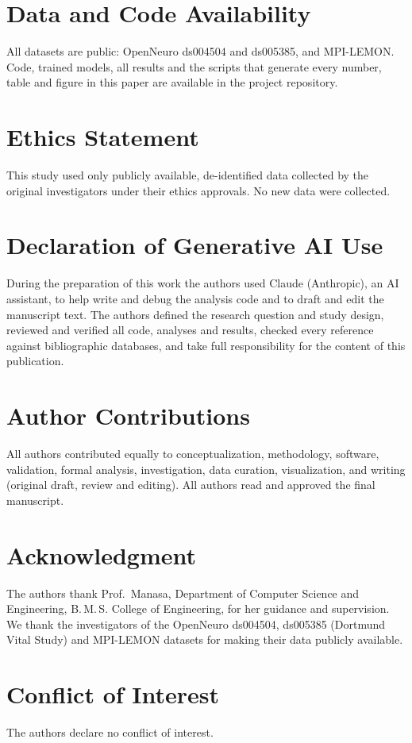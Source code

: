 \documentclass[journal]{IEEEtran}
\begin{document}
\section*{Data and Code Availability}
All datasets are public: OpenNeuro ds004504 and ds005385, and MPI-LEMON. Code, trained models, all results and the scripts that generate every number, table and figure in this paper are available in the project repository.

\section*{Ethics Statement}
This study used only publicly available, de-identified data collected by the original investigators under their ethics approvals. No new data were collected.

\section*{Declaration of Generative AI Use}
During the preparation of this work the authors used Claude (Anthropic), an AI assistant, to help write and debug the analysis code and to draft and edit the manuscript text. The authors defined the research question and study design, reviewed and verified all code, analyses and results, checked every reference against bibliographic databases, and take full responsibility for the content of this publication.

\section*{Author Contributions}
All authors contributed equally to conceptualization, methodology, software, validation, formal analysis, investigation, data curation, visualization, and writing (original draft, review and editing). All authors read and approved the final manuscript.

\section*{Acknowledgment}
The authors thank Prof.~Manasa, Department of Computer Science and Engineering, B.\,M.\,S. College of Engineering, for her guidance and supervision. We thank the investigators of the OpenNeuro ds004504, ds005385 (Dortmund Vital Study) and MPI-LEMON datasets for making their data publicly available.

\section*{Conflict of Interest}
The authors declare no conflict of interest.



\end{document}
